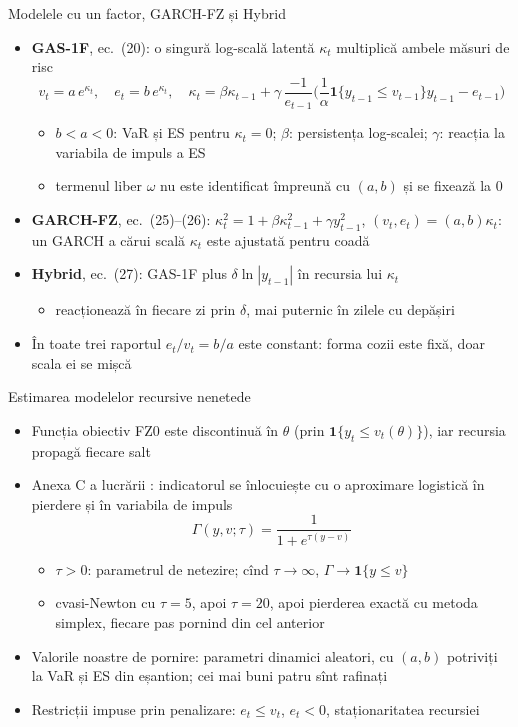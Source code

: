 \begin{frame}{Modelele cu un factor, GARCH-FZ și Hybrid}
\itemsize{\footnotesize}
\begin{itemize}
    \item \textbf{GAS-1F}, ec.~(20): o singură log-scală latentă $\kappa_t$ multiplică ambele măsuri de risc
    \[ v_t = a\,e^{\kappa_t}, \quad e_t = b\,e^{\kappa_t}, \quad \kappa_t = \beta\kappa_{t-1} + \gamma\,\frac{-1}{e_{t-1}}\Big(\frac{1}{\alpha}\mathbf 1\{y_{t-1} \le v_{t-1}\}y_{t-1} - e_{t-1}\Big) \]
    \begin{itemize}
        \item $b < a < 0$: VaR și ES pentru $\kappa_t = 0$; $\beta$: persistența log-scalei; $\gamma$: reacția la variabila de impuls a ES
        \item termenul liber $\omega$ nu este identificat împreună cu $(a, b)$ și se fixează la 0
    \end{itemize}
    \item \textbf{GARCH-FZ}, ec.~(25)--(26): $\kappa_t^2 = 1 + \beta\kappa_{t-1}^2 + \gamma y_{t-1}^2$, $(v_t, e_t) = (a, b)\kappa_t$: un GARCH a cărui scală $\kappa_t$ este ajustată pentru coadă
    \item \textbf{Hybrid}, ec.~(27): GAS-1F plus $\delta\ln|y_{t-1}|$ în recursia lui $\kappa_t$
    \begin{itemize}
        \item reacționează în fiecare zi prin $\delta$, mai puternic în zilele cu depășiri
    \end{itemize}
    \item În toate trei raportul $e_t/v_t = b/a$ este constant: forma cozii este fixă, doar scala ei se mișcă
\end{itemize}
\end{frame}

\begin{frame}{Estimarea modelelor recursive nenetede}
\itemsize{\small}
\begin{itemize}
    \item Funcția obiectiv FZ0 este discontinuă în $\theta$ (prin $\mathbf 1\{y_t \le v_t(\theta)\}$), iar recursia propagă fiecare salt
    \item Anexa C a lucrării : indicatorul se înlocuiește cu o aproximare logistică în pierdere și în variabila de impuls
    \[ \Gamma(y, v; \tau) = \frac{1}{1 + e^{\tau(y - v)}} \]
    \begin{itemize}
        \item $\tau > 0$: parametrul de netezire; cînd $\tau \to \infty$, $\Gamma \to \mathbf 1\{y \le v\}$
        \item cvasi-Newton cu $\tau = 5$, apoi $\tau = 20$, apoi pierderea exactă cu metoda simplex, fiecare pas pornind din cel anterior
    \end{itemize}
    \item Valorile noastre de pornire: parametri dinamici aleatori, cu $(a, b)$ potriviți la VaR și ES din eșantion; cei mai buni patru sînt rafinați
    \item Restricții impuse prin penalizare: $e_t \le v_t$, $e_t < 0$, staționaritatea recursiei
\end{itemize}
\end{frame}

